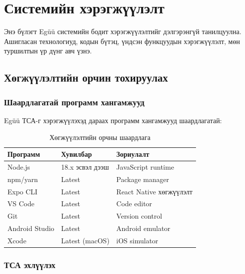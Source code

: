 
\section{Системийн хэрэгжүүлэлт}
\label{sec:implementation}

Энэ бүлэгт Egüü системийн бодит хэрэгжүүлэлтийг дэлгэрэнгүй танилцуулна. Ашигласан технологиуд, кодын бүтэц, үндсэн функцуудын хэрэгжүүлэлт, мөн туршилтын үр дүнг авч үзнэ.

\subsection{Хөгжүүлэлтийн орчин тохируулах}
\label{subsec:development-setup}

\subsubsection{Шаардлагатай программ хангамжууд}

Egüü ТСА-г хэрэгжүүлэхэд дараах программ хангамжууд шаардлагатай:

\begin{table}[H]
\centering
\caption{Хөгжүүлэлтийн орчны шаардлага}
\label{tab:dev-requirements}
\begin{tabular}{|l|l|l|}
\hline
\textbf{Программ} & \textbf{Хувилбар} & \textbf{Зориулалт} \\
\hline
Node.js & 18.x эсвэл дээш & JavaScript runtime \\
\hline
npm/yarn & Latest & Package manager \\
\hline
Expo CLI & Latest & React Native хөгжүүлэлт \\
\hline
VS Code & Latest & Code editor \\
\hline
Git & Latest & Version control \\
\hline
Android Studio & Latest & Android emulator \\
\hline
Xcode & Latest (macOS) & iOS simulator \\
\hline
\end{tabular}
\end{table}

\subsubsection{ТСА эхлүүлэх}

